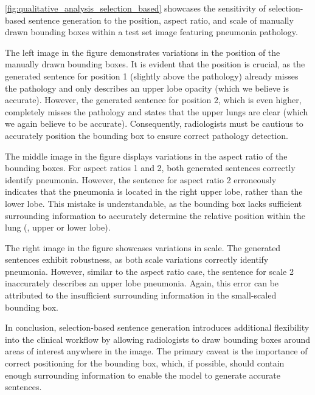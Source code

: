 \documentclass[10pt,twocolumn,letterpaper]{article}
\begin{document}
\begin{multicols}{2}
\cref{fig:qualitative_analysis_selection_based} showcases the sensitivity of selection-based sentence generation to the position, aspect ratio, and scale of manually drawn bounding boxes within a test set image featuring pneumonia pathology.

The left image in the figure demonstrates variations in the position of the manually drawn bounding boxes. It is evident that the position is crucial, as the generated sentence for position 1 (slightly above the pathology) already misses the pathology and only describes an upper lobe opacity (which we believe is accurate). However, the generated sentence for position 2, which is even higher, completely misses the pathology and states that the upper lungs are clear (which we again believe to be accurate). Consequently, radiologists must be cautious to accurately position the bounding box to ensure correct pathology detection.

The middle image in the figure displays variations in the aspect ratio of the bounding boxes. For aspect ratios 1 and 2, both generated sentences correctly identify pneumonia. However, the sentence for aspect ratio 2 erroneously indicates that the pneumonia is located in the right upper lobe, rather than the lower lobe. This mistake is understandable, as the bounding box lacks sufficient surrounding information to accurately determine the relative position within the lung (\ie, upper or lower lobe).

The right image in the figure showcases variations in scale. The generated sentences exhibit robustness, as both scale variations correctly identify pneumonia. However, similar to the aspect ratio case, the sentence for scale 2 inaccurately describes an upper lobe pneumonia. Again, this error can be attributed to the insufficient surrounding information in the small-scaled bounding box.

In conclusion, selection-based sentence generation introduces additional flexibility into the clinical workflow by allowing radiologists to draw bounding boxes around areas of interest anywhere in the image. The primary caveat is the importance of correct positioning for the bounding box, which, if possible, should contain enough surrounding information to enable the model to generate accurate sentences.
\end{multicols}
\FloatBarrier
\onecolumn
\end{document}
